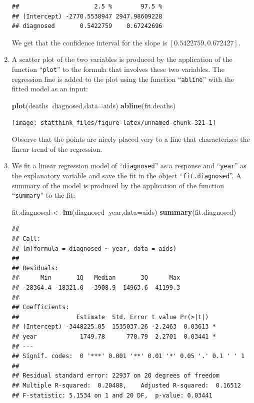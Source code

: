 \documentclass[]{krantz}
\makeatletter
\newenvironment{Shaded}{\begin{snugshade}}{\end{snugshade}}
\newcommand{\KeywordTok}[1]{\textcolor[rgb]{0.13,0.29,0.53}{\textbf{#1}}}
\newcommand{\DataTypeTok}[1]{\textcolor[rgb]{0.13,0.29,0.53}{#1}}
\newcommand{\StringTok}[1]{\textcolor[rgb]{0.31,0.60,0.02}{#1}}
\newcommand{\OperatorTok}[1]{\textcolor[rgb]{0.81,0.36,0.00}{\textbf{#1}}}
\newcommand{\NormalTok}[1]{#1}
\newenvironment{kframe}{%
\medskip{}
\setlength{\fboxsep}{.8em}
 \def\at@end@of@kframe{}%
 \ifinner\ifhmode%
  \def\at@end@of@kframe{\end{minipage}}%
  \begin{minipage}{\columnwidth}%
 \fi\fi%
 \def\FrameCommand##1{\hskip\@totalleftmargin \hskip-\fboxsep
 \colorbox{shadecolor}{##1}\hskip-\fboxsep
     \hskip-\linewidth \hskip-\@totalleftmargin \hskip\columnwidth}%
 \MakeFramed {\advance\hsize-\width
   \@totalleftmargin\z@ \linewidth\hsize
   \@setminipage}}%
 {\par\unskip\endMakeFramed%
 \at@end@of@kframe}
\renewenvironment{Shaded}{\begin{kframe}}{\end{kframe}}
\theoremstyle{definition}
\theoremstyle{definition}
\theoremstyle{definition}
\theoremstyle{remark}
\makeatother
\begin{document}
\begin{enumerate}
\begin{verbatim}
##                     2.5 %        97.5 %
## (Intercept) -2770.5538947 2947.98609228
## diagnosed       0.5422759    0.67242696
\end{verbatim}

  We get that the confidence interval for the slope is
  \([0.5422759 , 0.672427]\).
\item
  A scatter plot of the two variables is produced by the application of
  the function ``\texttt{plot}'' to the formula that involves these two
  variables. The regression line is added to the plot using the function
  ``\texttt{abline}'' with the fitted model as an input:

\begin{Shaded}
\begin{Highlighting}[]
\KeywordTok{plot}\NormalTok{(deaths}\OperatorTok{~}\NormalTok{diagnosed,}\DataTypeTok{data=}\NormalTok{aids)}
\KeywordTok{abline}\NormalTok{(fit.deaths)}
\end{Highlighting}
\end{Shaded}

  \begin{center}\texttt{[image: statthink\_files/figure-latex/unnamed-chunk-321-1]} \end{center}

  Observe that the points are nicely placed very to a line that
  characterizes the linear trend of the regression.
\item
  We fit a linear regression model of ``\texttt{diagnosed}'' as a
  response and ``\texttt{year}'' as the explanatory variable and save
  the fit in the object ``\texttt{fit.diagnosed}''. A summary of the
  model is produced by the application of the function
  ``\texttt{summary}'' to the fit:

\begin{Shaded}
\begin{Highlighting}[]
\NormalTok{fit.diagnosed <-}\StringTok{ }\KeywordTok{lm}\NormalTok{(diagnosed}\OperatorTok{~}\NormalTok{year,}\DataTypeTok{data=}\NormalTok{aids)}
\KeywordTok{summary}\NormalTok{(fit.diagnosed)}
\end{Highlighting}
\end{Shaded}

\begin{verbatim}
## 
## Call:
## lm(formula = diagnosed ~ year, data = aids)
## 
## Residuals:
##      Min       1Q   Median       3Q      Max 
## -28364.4 -18321.0  -3908.9  14963.6  41199.3 
## 
## Coefficients:
##                Estimate  Std. Error t value Pr(>|t|)  
## (Intercept) -3448225.05  1535037.26 -2.2463  0.03613 *
## year            1749.78      770.79  2.2701  0.03441 *
## ---
## Signif. codes:  0 '***' 0.001 '**' 0.01 '*' 0.05 '.' 0.1 ' ' 1
## 
## Residual standard error: 22937 on 20 degrees of freedom
## Multiple R-squared:  0.20488,    Adjusted R-squared:  0.16512 
## F-statistic: 5.1534 on 1 and 20 DF,  p-value: 0.03441
\end{verbatim}


\end{enumerate}
\end{document}
